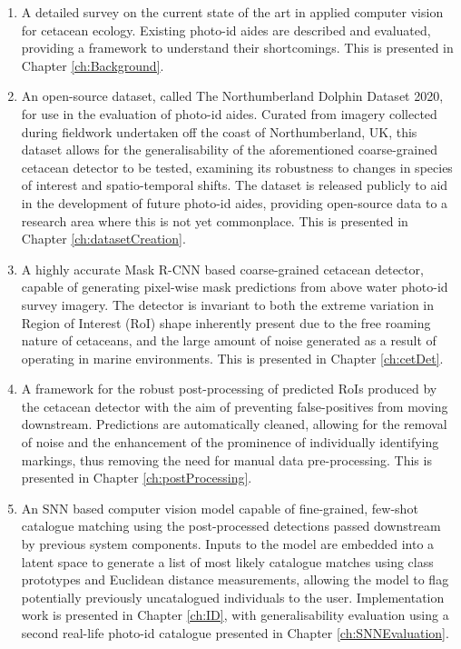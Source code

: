 \begin{enumerate}
	\item A detailed survey on the current state of the art in applied computer vision for cetacean ecology. Existing photo-id aides are described and evaluated, providing a framework to understand their shortcomings. This is presented in Chapter \ref{ch:Background}. 
	\item An open-source dataset, called The Northumberland Dolphin Dataset 2020, for use in the evaluation of photo-id aides. Curated from imagery collected during fieldwork undertaken off the coast of Northumberland, UK, this dataset allows for the generalisability of the aforementioned coarse-grained cetacean detector to be tested, examining its robustness to changes in species of interest and spatio-temporal shifts. The dataset is released publicly to aid in the development of future photo-id aides, providing open-source data to a research area where this is not yet commonplace. This is presented in Chapter \ref{ch:datasetCreation}.
	\item A highly accurate Mask R-CNN \cite{he_mask_2017} based coarse-grained cetacean detector, capable of generating pixel-wise mask predictions from above water photo-id survey imagery. The detector is invariant to both the extreme variation in Region of Interest (RoI) shape inherently present due to the free roaming nature of cetaceans, and the large amount of noise generated as a result of operating in marine environments.  This is presented in Chapter \ref{ch:cetDet}.
	\item A framework for the robust post-processing of predicted RoIs produced by the cetacean detector with the aim of preventing false-positives from moving downstream. Predictions are automatically cleaned, allowing for the removal of noise and the enhancement of the prominence of individually identifying markings, thus removing the need for manual data pre-processing. This is presented in Chapter \ref{ch:postProcessing}.
	\item An SNN based computer vision model capable of fine-grained, few-shot catalogue matching using the post-processed detections passed downstream by previous system components. Inputs to the model are embedded into a latent space to generate a list of most likely catalogue matches using class prototypes and Euclidean distance measurements, allowing the model to flag potentially previously uncatalogued individuals to the user. Implementation work is presented in Chapter \ref{ch:ID}, with generalisability evaluation using a second real-life photo-id catalogue presented in Chapter \ref{ch:SNNEvaluation}.
\end{enumerate}

